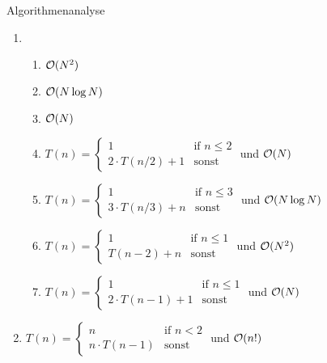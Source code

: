 \documentclass{article}
\begin{document}
\begin{exercise}{Algorithmenanalyse}
  \begin{solution}
    \begin{enumerate}
      \item \begin{enumerate}
              \item $\mathcal{O}(N^2)$
              \item $\mathcal{O}(N \log N)$
              \item $\mathcal{O}(N)$
              \item $T(n)= \begin{cases}
                        1                  & \text{if } n \leq 2 \\
                        2 \cdot T(n/2) + 1 & \text{sonst}
                      \end{cases}$ und $\mathcal{O}(N)$
              \item $T(n)= \begin{cases}
                        1                  & \text{if } n \leq 3 \\
                        3 \cdot T(n/3) + n & \text{sonst}
                      \end{cases}$ und $\mathcal{O}(N \log N)$
              \item $T(n)= \begin{cases}
                        1          & \text{if } n \leq 1 \\
                        T(n-2) + n & \text{sonst}
                      \end{cases}$ und $\mathcal{O}(N^2)$
              \item $T(n)= \begin{cases}
                        1                  & \text{if } n \leq 1 \\
                        2 \cdot T(n-1) + 1 & \text{sonst}
                      \end{cases}$ und $\mathcal{O}(N)$
            \end{enumerate}
      \item $T(n)=\begin{cases}
                n              & \text{if } n < 2 \\
                n \cdot T(n-1) & \text{sonst}
              \end{cases}$ und $\mathcal{O}(n!)$
    \end{enumerate}
  \end{solution}
\end{exercise}
\end{document}
